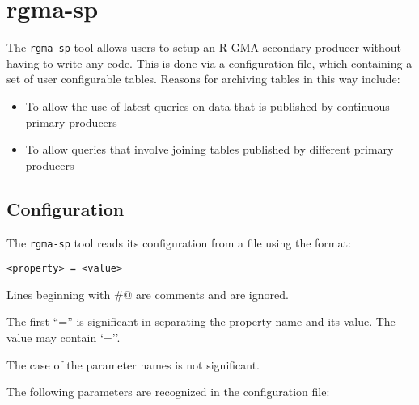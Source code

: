 \section{rgma-sp}
\label{sec:rgma-sp}
The \texttt{rgma-sp} tool allows users to setup an R-GMA secondary
producer without having to write any code. This is done via a
configuration file, which containing a set of user configurable
tables. Reasons for archiving tables in this way include:

\begin{itemize}
\item To allow the use of latest queries on data that is published by
  continuous primary producers
\item To allow queries that involve joining tables published by
  different primary producers
\end{itemize}

\subsection{Configuration}

The \texttt{rgma-sp} tool reads its configuration from a file using
the format:

\begin{verbatim}
<property> = <value>
\end{verbatim}

Lines beginning with \verb@#@ are comments and are ignored.

The first ``='' is significant in separating the property name and its
value. The value may contain `=''.

The case of the parameter names is not significant.

The following parameters are recognized in the configuration file:

